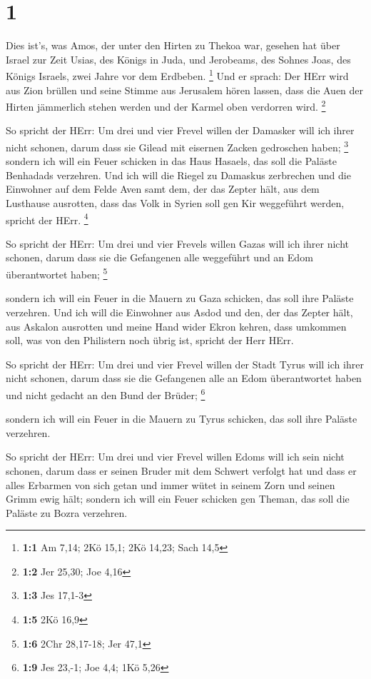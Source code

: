 \hypertarget{section}{%
\section{1}\label{section}}

 Dies ist's, was Amos, der unter den Hirten zu Thekoa war,
gesehen hat über Israel zur Zeit Usias, des Königs in Juda, und
Jerobeams, des Sohnes Joas, des Königs Israels, zwei Jahre vor dem
Erdbeben. \footnote{\textbf{1:1} Am 7,14; 2Kö 15,1; 2Kö 14,23; Sach 14,5}
 Und er sprach: Der HErr wird aus Zion brüllen und seine
Stimme aus Jerusalem hören lassen, dass die Auen der Hirten jämmerlich
stehen werden und der Karmel oben verdorren wird. \footnote{\textbf{1:2}
  Jer 25,30; Joe 4,16}

 So spricht der HErr: Um drei und vier Frevel willen der
Damasker will ich ihrer nicht schonen, darum dass sie Gilead mit
eisernen Zacken gedroschen haben; \footnote{\textbf{1:3} Jes 17,1-3}
 sondern ich will ein Feuer schicken in das Haus Hasaels,
das soll die Paläste Benhadads verzehren.  Und ich will die
Riegel zu Damaskus zerbrechen und die Einwohner auf dem Felde Aven samt
dem, der das Zepter hält, aus dem Lusthause ausrotten, dass das Volk in
Syrien soll gen Kir weggeführt werden, spricht der HErr. \footnote{\textbf{1:5}
  2Kö 16,9}

 So spricht der HErr: Um drei und vier Frevels willen Gazas
will ich ihrer nicht schonen, darum dass sie die Gefangenen alle
weggeführt und an Edom überantwortet haben; \footnote{\textbf{1:6} 2Chr
  28,17-18; Jer 47,1}

 sondern ich will ein Feuer in die Mauern zu Gaza schicken,
das soll ihre Paläste verzehren.  Und ich will die Einwohner
aus Asdod und den, der das Zepter hält, aus Askalon ausrotten und meine
Hand wider Ekron kehren, dass umkommen soll, was von den Philistern noch
übrig ist, spricht der Herr HErr.

 So spricht der HErr: Um drei und vier Frevel willen der
Stadt Tyrus will ich ihrer nicht schonen, darum dass sie die Gefangenen
alle an Edom überantwortet haben und nicht gedacht an den Bund der
Brüder; \footnote{\textbf{1:9} Jes 23,-1; Joe 4,4; 1Kö 5,26}

 sondern ich will ein Feuer in die Mauern zu Tyrus
schicken, das soll ihre Paläste verzehren.

 So spricht der HErr: Um drei und vier Frevel willen Edoms
will ich sein nicht schonen, darum dass er seinen Bruder mit dem Schwert
verfolgt hat und dass er alles Erbarmen von sich getan und immer wütet
in seinem Zorn und seinen Grimm ewig hält;  sondern ich
will ein Feuer schicken gen Theman, das soll die Paläste zu Bozra
verzehren.

